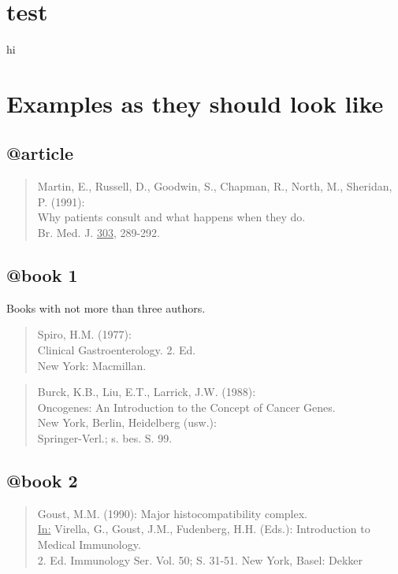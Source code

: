 \documentclass{article}
\begin{document}
\section{test}

hi \nocite{*}

\section{Examples as they should look like}

\subsection{@article}

\begin{quote}
Martin, E., Russell, D., Goodwin, S., Chapman, R., North, M., Sheridan, P. (1991):\\
Why patients consult and what happens when they do.\\
Br. Med. J. \underline{303}, 289-292.
\end{quote}

\subsection{@book 1}

Books with not more than three authors.

\begin{quote}
Spiro, H.M. (1977):\\
Clinical Gastroenterology. 2. Ed.\\
New York: Macmillan.
\end{quote}

\begin{quote}
Burck, K.B., Liu, E.T., Larrick, J.W. (1988):\\
Oncogenes: An Introduction to the Concept of Cancer Genes.\\
New York, Berlin, Heidelberg (usw.):\\
Springer-Verl.; s. bes. S. 99.
\end{quote}

\subsection{@book 2}

\begin{quote}
Goust, M.M. (1990): Major histocompatibility complex.\\
\underline{In:} Virella, G., Goust, J.M., Fudenberg, H.H. (Eds.): Introduction to Medical Immunology.\\
2. Ed. Immunology Ser. Vol. 50; S. 31-51. New York, Basel: Dekker
\end{quote}
\end{document}
